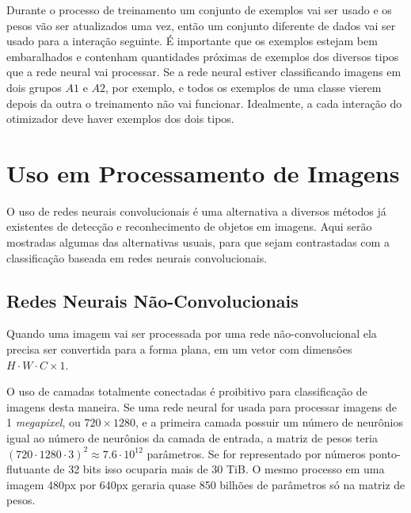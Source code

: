 Durante o processo de treinamento um conjunto de exemplos vai ser usado e os
pesos vão ser atualizados uma vez, então um conjunto diferente de dados vai ser
usado para a interação seguinte. É importante que os exemplos estejam bem
embaralhados e contenham quantidades próximas de exemplos dos diversos tipos
que a rede neural vai processar. Se a rede neural estiver classificando imagens
em dois grupos $A1$ e $A2$, por exemplo, e todos os exemplos de uma classe
vierem depois da outra o treinamento não vai funcionar. Idealmente, a cada
interação do otimizador deve haver exemplos dos dois tipos.

%

\section{Uso em Processamento de Imagens}
O uso de redes neurais convolucionais é uma alternativa a diversos métodos já
existentes de detecção e reconhecimento de objetos em imagens. Aqui serão
mostradas algumas das alternativas usuais, para que sejam contrastadas
com a classificação baseada em redes neurais convolucionais.

\subsection{Redes Neurais Não-Convolucionais}
Quando uma imagem vai ser processada por uma rede não-convolucional ela precisa
ser convertida para a forma plana, em um vetor com dimensões
$H \cdot W \cdot C \times 1$.

O uso de camadas totalmente conectadas é proibitivo para classificação de
imagens desta maneira. Se uma rede neural for usada para processar imagens de 1
\emph{megapixel}, ou $720 \times 1280$, e a primeira camada possuir um
número de neurônios igual
ao número de neurônios da camada de entrada, a matriz de pesos teria
$(720 \cdot 1280 \cdot 3)^2 \approx 7.6 \cdot 10^{12}$ parâmetros. Se for
representado por números ponto-flutuante de 32 bits isso ocuparia mais de
30 TiB. O mesmo processo em uma imagem 480px por 640px geraria quase 850
bilhões de parâmetros só na matriz de pesos.

